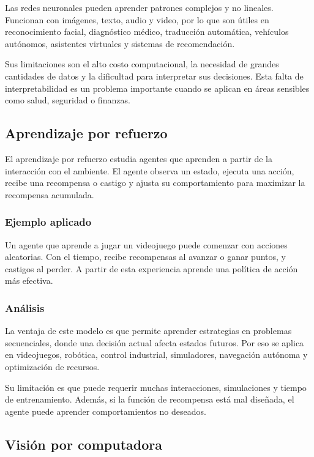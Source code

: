 Las redes neuronales pueden aprender patrones complejos y no lineales. Funcionan con imágenes, texto, audio y video, por lo que son útiles en reconocimiento facial, diagnóstico médico, traducción automática, vehículos autónomos, asistentes virtuales y sistemas de recomendación.

Sus limitaciones son el alto costo computacional, la necesidad de grandes cantidades de datos y la dificultad para interpretar sus decisiones. Esta falta de interpretabilidad es un problema importante cuando se aplican en áreas sensibles como salud, seguridad o finanzas.

\subsection{Aprendizaje por refuerzo}

El aprendizaje por refuerzo estudia agentes que aprenden a partir de la interacción con el ambiente. El agente observa un estado, ejecuta una acción, recibe una recompensa o castigo y ajusta su comportamiento para maximizar la recompensa acumulada.

\subsubsection{Ejemplo aplicado}

Un agente que aprende a jugar un videojuego puede comenzar con acciones aleatorias. Con el tiempo, recibe recompensas al avanzar o ganar puntos, y castigos al perder. A partir de esta experiencia aprende una política de acción más efectiva.

\subsubsection{Análisis}

La ventaja de este modelo es que permite aprender estrategias en problemas secuenciales, donde una decisión actual afecta estados futuros. Por eso se aplica en videojuegos, robótica, control industrial, simuladores, navegación autónoma y optimización de recursos.

Su limitación es que puede requerir muchas interacciones, simulaciones y tiempo de entrenamiento. Además, si la función de recompensa está mal diseñada, el agente puede aprender comportamientos no deseados.

\subsection{Visión por computadora}

